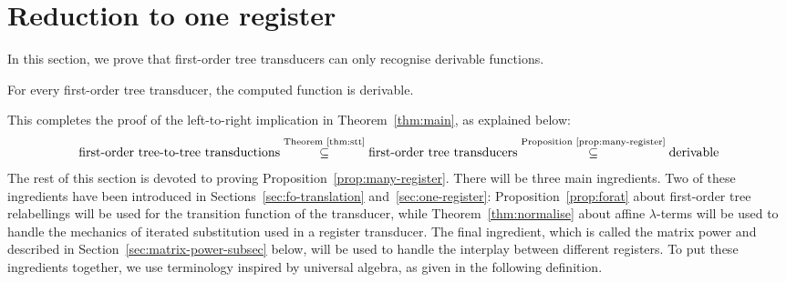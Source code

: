 \section{Reduction to one register}

\newcommand{\regalg}{{\alg_{\rGamma,\regnames}}}
\newcommand{\alg}{{\color{black}\mathbf A}}
\newcommand{\balg}{{\color{black}\mathbf B}}
\newcommand{\algops}[1]{\ranked{\text{signature of }}#1}
\newcommand{\algdom}[1]{{\color{black}\text{domain of }}#1}
\newcommand{\redpar}[1]{\ranked(#1\ranked)}
\newcommand{\treepar}[1]{\trees \redpar{#1}}
\newcommand{\regups}{\ranked{\text{register updates}}}
\newcommand{\regvalss}{{\text{register valuations}}}
\label{sec:matrix-power}
In this section, we prove that first-order  tree transducers can only recognise derivable functions. 
\begin{proposition}
    \label{prop:many-register} 
For every first-order  tree transducer, the computed function is derivable. 
\end{proposition}
This completes the proof of the left-to-right implication in Theorem~\ref{thm:main}, as explained below:
\begin{align*}
\text{first-order tree-to-tree transductions}  \stackrel {\text{Theorem~\ref{thm:stt}}}\subseteq  \text{first-order tree transducers} \stackrel {\text{Proposition~\ref{prop:many-register}}} \subseteq \text{derivable}
\end{align*}
The rest of this section is devoted to proving Proposition~\ref{prop:many-register}. There will be three main ingredients. Two of these ingredients have been introduced in Sections~\ref{sec:fo-translation} and~\ref{sec:one-register}:    Proposition~\ref{prop:forat} about  first-order tree relabellings will be used for the transition function of the transducer, while  Theorem~\ref{thm:normalise} about affine $\lambda$-terms will be used to handle the mechanics of iterated substitution used in a register transducer. The final ingredient, which is called the {matrix power} and described in Section~\ref{sec:matrix-power-subsec} below, will be used to handle the interplay between different registers.  To put these ingredients together, we use  terminology inspired by universal algebra, as given in the following definition. 

